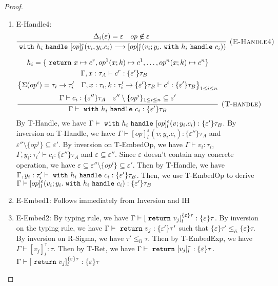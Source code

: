 \begin{lemma}
\begin{proof}
\begin{enumerate}
\item E-Handle4:
$$
\infer[\textsc{(E-Handle4)}]
  {\m{with} h_i \m{handle} [op]^\varepsilon_l(v_i, y_i.c_i) \longrightarrow [op]^\varepsilon_l(v_i; y_i. \m{with} h_i \m{handle} c_i))}
  {\Delta_i(\varepsilon) = \varepsilon & op \not \in \varepsilon} 
$$

$$
\infer[\textsc{(T-handle)}]
  {\Gamma\vdash \m{with} h_i \m{handle} c_i: \{\varepsilon'\} \tau_B}
  {\begin{gathered}
  h_i = \{\m{return} x \mapsto c^r, op^1(x;k) \mapsto c^1, \dots, op^n(x;k) \mapsto c^n \}\\
  \Gamma, x: \tau_A \vdash c^r : \{\varepsilon'\}\tau_B \quad \\
  \left\{ \Sigma(op^i) = \tau_i \rightarrow \tau_i'  \quad \Gamma, x:\tau_i, k:\tau_i' \rightarrow \{\varepsilon'\}\tau_B \vdash c^i: \{\varepsilon'\}\tau_B    \right\}_{1 \leq i \leq n} \\
  \Gamma \vdash c_i : \{\varepsilon''\}\tau_A \quad \varepsilon'' \setminus \{op^i\}_{1 \leq i \leq n} \subseteq \varepsilon'
  \end{gathered}}
$$
By T-Handle, we have $\Gamma \vdash \ \texttt{with}\  h_i \ \texttt{handle}\  [op]^\varepsilon_l(v;y_i.c_i) :  \{\varepsilon'\}\tau_B$. By inversion on T-Handle, we have $\Gamma \vdash [op]^\varepsilon_l(v;y_i.c_i): \{\varepsilon''\}\tau_A$ and $\varepsilon'' \setminus \{op^i\} \subseteq \varepsilon'$. By inversion on T-EmbedOp, we have $\Gamma \vdash v_i: \tau_i$, $\Gamma, y_i:\tau_i' \vdash c_i : \{\varepsilon''\}\tau_A$ and $\varepsilon \subseteq \varepsilon''$. Since $\varepsilon$ doesn't contain any concrete operation, we have $\varepsilon \subseteq  \varepsilon'' \setminus \{op^i\} \subseteq \varepsilon' $. Then by T-Handle, we have $\Gamma, y_i: \tau_i' \vdash \ \texttt{with}\  h_i \ \texttt{handle}\  c_i : \{\varepsilon'\}\tau_B$. Then, we use T-EmbedOp to derive $\Gamma \vdash [op]^\varepsilon_l(v_i; y_i. \ \texttt{with}\  h_i \ \texttt{handle}\  c_i) : \{\varepsilon'\}\tau_B$


\item E-Embed1: Follows immediately from Inversion and IH
\item E-Embed2: By typing rule, we have $\Gamma \vdash [\ \texttt{return}\  v_j]^{\{\varepsilon\}\tau}_l :\{\varepsilon\}\tau$. By inversion on the typing rule, we have $\Gamma \vdash \ \texttt{return}\  v_j : \{\varepsilon'\}\tau'$ such that $\{\varepsilon\}\tau' \leq_{li} \{\varepsilon\}\tau$. By inversion on R-Sigma, we have $\tau' \leq_{li} \tau$. Then by T-EmbedExp, we have $\Gamma \vdash [v_j]^\tau_l : \tau$. Then by T-Ret, we have $\Gamma \vdash \ \texttt{return}\   [v_j]^\tau_l : \{\varepsilon\}\tau$. $\Gamma \vdash [\ \texttt{return}\  v_j]^{\{\varepsilon\}\tau}_l :\{\varepsilon\}\tau$


\end{enumerate}
\end{proof}
\end{lemma}
